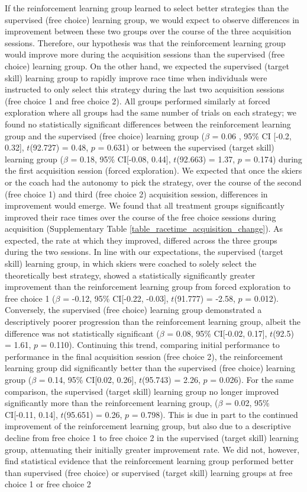 \documentclass[pdflatex,sn-nature]{sn-jnl}%
\theoremstyle{thmstyleone}%
\theoremstyle{thmstyletwo}%
\theoremstyle{thmstylethree}%
\begin{document}
If the reinforcement learning group learned to select better strategies than the supervised (free choice) learning group, we would expect to observe differences in improvement between these two groups over the course of the three acquisition sessions. Therefore, our hypothesis was that the reinforcement learning group would improve more during the acquisition sessions than the supervised (free choice) learning group. On the other hand, we expected the supervised (target skill) learning group to rapidly improve race time when individuals were instructed to only select this strategy during the last two acquisition sessions (free choice 1 and free choice 2). All groups performed similarly at forced exploration where all groups had the same number of trials on each strategy; we found no statistically significant differences between the reinforcement learning group and the supervised (free choice) learning group ($\beta$ = 0.06 , 95\% CI [-0.2, 0.32], $t$(92.727) = 0.48, $p$ = 0.631) or between the supervised (target skill) learning group ($\beta$ = 0.18, 95\% CI[-0.08, 0.44], $t$(92.663) = 1.37, $p$ = 0.174) during the first acquisition session (forced exploration). We expected that once the skiers or the coach had the autonomy to pick the strategy, over the course of the second (free choice 1) and third (free choice 2) acquisition session, differences in improvement would emerge. We found that all treatment groups significantly improved their race times over the course of the free choice sessions during acquisition (Supplementary Table \ref{table_racetime_acquisition_change}). As expected, the rate at which they improved, differed across the three groups during the two sessions. In line with our expectations, the supervised (target skill) learning group, in which skiers were coached to solely select the theoretically best strategy, showed a statistically significantly greater improvement than the reinforcement learning group from forced exploration to free choice 1  ($\beta$ = -0.12, 95\% CI[-0.22, -0.03], $t$(91.777) = -2.58, $p$ = 0.012). Conversely, the supervised (free choice) learning group demonstrated a descriptively poorer progression than the reinforcement learning group, albeit the difference was not statistically significant ($\beta$ = 0.08, 95\% CI[-0.02, 0.17], $t$(92.5) = 1.61, $p$ = 0.110). Continuing this trend, comparing initial  performance to performance in the final acquisition session (free choice 2), the reinforcement learning group did significantly better than the supervised (free choice) learning group ($\beta$ = 0.14, 95\% CI[0.02, 0.26], $t$(95.743) = 2.26, $p$ = 0.026). For the same comparison, the supervised (target skill) learning group no longer improved significantly more than the reinforcement learning group, ($\beta$ = 0.02, 95\% CI[-0.11, 0.14], $t$(95.651) = 0.26, $p$ = 0.798). This is due in part to the continued improvement of the reinforcement learning group, but also due to a descriptive decline from free choice 1 to free choice 2 in the supervised (target skill) learning group, attenuating their initially greater improvement rate. We did not, however, find statistical evidence that the reinforcement learning group performed better than supervised (free choice) or supervised (target skill) learning groups at free choice 1 or free choice 2 
\end{document}
